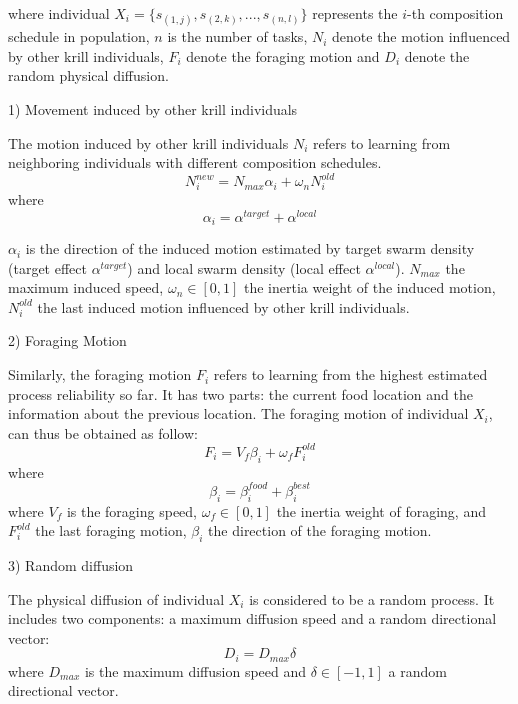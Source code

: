 \documentclass[journal]{IEEEtran}
\begin{document}
where individual $X_i = \{s_{(1,j)}, s_{(2,k)}, . . . , s_{(n,l)}\}$ represents the $i$-th composition schedule in population, $n$ is the number of tasks, $N_i$ denote the motion influenced by other krill individuals, $F_i$ denote the foraging motion and $D_i$ denote the random physical diffusion.

1) Movement induced by other krill individuals

The motion induced by other krill individuals $N_i$ refers to learning from neighboring individuals with different composition schedules.
\begin{equation}
N^{new}_i = N_{max}\alpha_i + \omega_n N^{old}_i
\end{equation}
where
\begin{equation}
\alpha_i = \alpha^{target} + \alpha^{local}
\end{equation}

$\alpha_i$ is the direction of the induced motion estimated by target swarm density (target effect $\alpha^{target}$) and local swarm density (local effect $\alpha^{local}$). $N_{max}$ the maximum induced speed, $\omega_n \in [0, 1]$ the inertia weight of the induced motion, $N^{old}_{i}$ the last induced motion influenced by other krill individuals.

2) Foraging Motion

Similarly, the foraging motion $F_i$ refers to learning from the highest estimated process reliability so far. 
It has two parts: the current food location and the information about the previous location. 
The foraging motion of individual $X_i$, can thus be obtained as follow:
\begin{equation}
F_i = V_f\beta_i + \omega_f F^{old}_i
\end{equation}
where
\begin{equation}
\beta_i = \beta_i^{food}+\beta_i^{best}
\end{equation}
where $V_f$ is the foraging speed, $\omega_f \in [0, 1]$ the inertia weight of foraging, and $F^{old}_i$ the last foraging motion, $\beta_i$ the direction of the foraging motion.

3) Random diffusion

The physical diffusion of individual $X_i$ is considered to be a random process. It includes two components: a maximum diffusion speed and a random directional vector:
\begin{equation}
D_i = D_{max}\delta
\end{equation}
where $D_{max}$ is the maximum diffusion speed and $\delta \in [-1, 1]$ a random directional vector.
\end{document}
